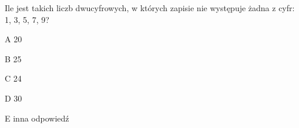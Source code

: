 \begin{tresc}
Ile jest takich liczb dwucyfrowych, w których zapisie nie występuje żadna z cyfr: 1, 3, 5, 7, 9?
\end{tresc}
\begin{wariant}{A} 20 \end{wariant}
\begin{wariant}{B} 25 \end{wariant}
\begin{wariant}{C} 24 \end{wariant}
\begin{wariant}{D} 30 \end{wariant}
\begin{wariant}{E} inna odpowiedź \end{wariant}
